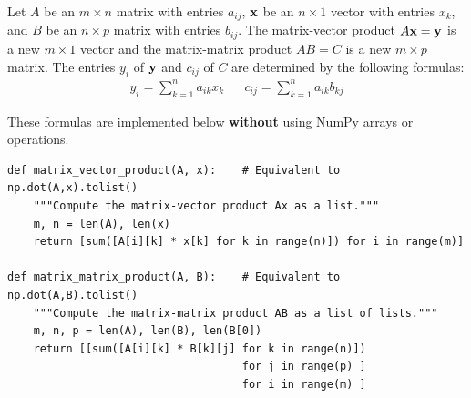 \begin{problem} %
Let $A$ be an $m \times n$ matrix with entries $a_{ij}$, $\mathbf{x}$ be an $n \times 1$ vector with entries $x_k$, and $B$ be an $n \times p$ matrix with entries $b_{ij}$.
%
%
The matrix-vector product $A\mathbf{x} = \mathbf{y}$ is a new $m \times 1$ vector and the matrix-matrix product $AB = C$ is a new $m \times p$ matrix.
The entries $y_i$ of $\mathbf{y}$ and $c_{ij}$ of $C$ are determined by the following formulas:
%
\begin{align*}
y_i = \sum_{k=1}^n a_{ik}x_k%
&&
c_{ij} = \sum_{k=1}^n a_{ik}b_{kj}%
\end{align*}

These formulas are implemented below \textbf{without} using NumPy arrays or operations.

\begin{lstlisting}
def matrix_vector_product(A, x):    # Equivalent to np.dot(A,x).tolist()
    """Compute the matrix-vector product Ax as a list."""
    m, n = len(A), len(x)
    return [sum([A[i][k] * x[k] for k in range(n)]) for i in range(m)]

def matrix_matrix_product(A, B):    # Equivalent to np.dot(A,B).tolist()
    """Compute the matrix-matrix product AB as a list of lists."""
    m, n, p = len(A), len(B), len(B[0])
    return [[sum([A[i][k] * B[k][j] for k in range(n)])
                                    for j in range(p) ]
                                    for i in range(m) ]
\end{lstlisting}


\end{problem}
